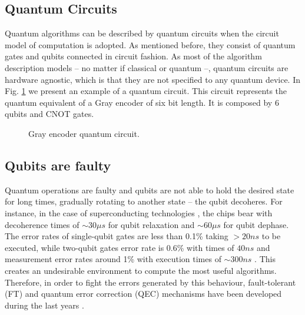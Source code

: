 \subsection{Quantum Circuits}
\label{sec:org836a422}

Quantum algorithms can be described by quantum circuits when the circuit model of computation is adopted.
As mentioned before, they consist of quantum gates and qubits connected in circuit fashion.
As most of the algorithm description models -- no matter if classical or quantum --, quantum circuits are hardware agnostic, which is that they are not specified to any quantum device.
In Fig. \ref{fig:circuit_example} we present an example of a quantum circuit.
This circuit represents the quantum equivalent of a Gray encoder of six bit length.
It is composed by 6 qubits and CNOT gates.

\begin{figure}[H]
    \centering

\caption{Gray encoder quantum circuit.}
\label{fig:circuit_example}
\end{figure}


\subsection{Qubits are faulty}
\label{sec:org9e13eea}
Quantum operations are faulty and qubits are not able to hold the desired state for long times, gradually rotating to another state -- the qubit decoheres.
For instance, in the case of superconducting technologies \cite{O_Brien_2017}, the chips bear with decoherence times of \(\sim 30 \mu s\) for qubit relaxation and \(\sim 60 \mu s\) for qubit dephase.
The error rates of single-qubit gates are less than 0.1\% taking \(> 20 ns\) to be executed, while two-qubit gates error rate is 0.6\% with times of \(40 ns\) and measurement error rates around 1\% with execution times of \(\sim 300 ns\) \cite{O_Brien_2017,Versluis_2017}.
This creates an undesirable environment to compute the most useful algorithms.
Therefore, in order to fight the errors generated by this behaviour, fault-tolerant (FT) and quantum error correction (QEC) mechanisms have been developed during the last years \cite{Nielsen_2009}.

